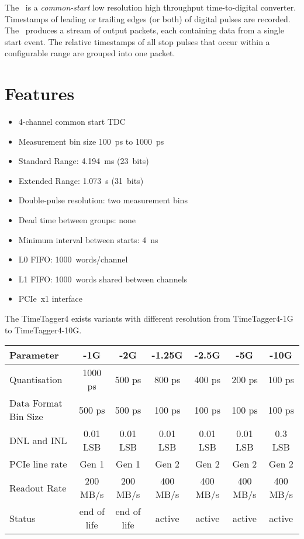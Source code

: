 The \deviceName\ is a \emph{common-start} low resolution high throughput time-to-digital converter. 
Timestamps of leading or trailing edges (or both) of digital pulses are recorded. 
The \deviceName\ produces a stream of output packets, each containing data from a single start event. 
The relative timestamps of all stop pulses that occur within a configurable range are grouped into one packet.

\section{Features}
	\begin{itemize}
		\item 4-channel common start TDC
		\item Measurement bin size 100~ps to 1000~ps
		\item Standard Range: 4.194~ms (23~bits)
		\item Extended Range: 1.073~s (31~bits)
		\item Double-pulse resolution: two measurement bins 
		\item Dead time between groups: none
		\item Minimum interval between starts: 4~ns
		\item L0 FIFO: 1000~words/channel
		\item L1 FIFO: 1000~words shared between channels
		\item PCIe~x1 interface
	\end{itemize} 

	The TimeTagger4 exists variants with different resolution from TimeTagger4-1G to TimeTagger4-10G.  

	\noindent
	\begin{tabularx}{\textwidth}{|X|c|c|c|c|c|c|}
		\hline
		Parameter & -1G & -2G & -1.25G & -2.5G & -5G & -10G\\
		\hline\hline
		Quantisation & 1000 ps & 500 ps & 800 ps & 400 ps & 200 ps & 100 ps \\
		\hline
		Data Format Bin Size & 500 ps & 500 ps & 100 ps & 100 ps & 100 ps & 100 ps \\
		\hline 
		DNL and INL & 0.01 LSB & 0.01 LSB & 0.01 LSB & 0.01 LSB & 0.01 LSB & 0.3 LSB \\
		\hline 
		PCIe line rate & Gen 1 & Gen 1 & Gen 2 & Gen 2 & Gen 2 & Gen 2\\  
		\hline 
		Readout Rate & 200 MB/s & 200 MB/s & 400 MB/s & 400 MB/s & 400 MB/s & 400 MB/s\\ 
		\hline 
		Status & end of life & end of life & active & active & active & active \\
		\hline
	\end{tabularx}

